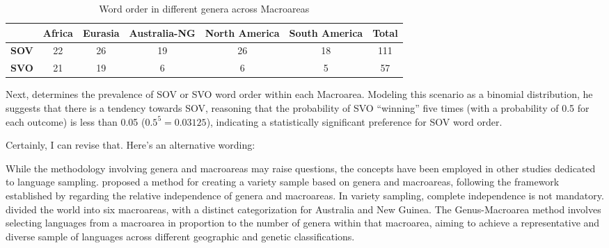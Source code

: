 \begin{table}[ht]
	\centering
	\begin{tabular}{@{}ccccccc@{}}
		\toprule
		\multicolumn{1}{l}{} & \textbf{Africa} & \textbf{Eurasia} & \textbf{Australia-NG} & \textbf{North America} & \textbf{South America} & \textbf{Total} \\ \midrule
		\textbf{SOV}         & 22              & 26               & 19                    & 26                     & 18                     & 111            \\
		\textbf{SVO}         & 21              & 19               & 6                     & 6                      & 5                      & 57             \\ \bottomrule
	\end{tabular}
	\caption{Word order in different genera across Macroareas}\label{dryer_table}
\end{table}

Next, \citet{dryer1989large} determines the prevalence of SOV or SVO word order within each Macroarea. Modeling this scenario as a binomial distribution, he suggests that there is a tendency towards SOV, reasoning that the probability of SVO ``winning'' five times (with a probability of 0.5 for each outcome) is less than 0.05 ($0.5^5 = 0.03125$), indicating a statistically significant preference for SOV word order.

Certainly, I can revise that. Here's an alternative wording:

While the methodology involving genera and macroareas may raise questions, the concepts have been employed in other studies dedicated to language sampling. \citet{miestamo2016sampling} proposed a method for creating a variety sample based on genera and macroareas, following the framework established by \citet{dryer1989large} regarding the relative independence of genera and macroareas. In variety sampling, complete independence is not mandatory. \citet{miestamo2016sampling} divided the world into six macroareas, with a distinct categorization for Australia and New Guinea. The Genus-Macroarea method involves selecting languages from a macroarea in proportion to the number of genera within that macroarea, aiming to achieve a representative and diverse sample of languages across different geographic and genetic classifications.



\subsection{}


